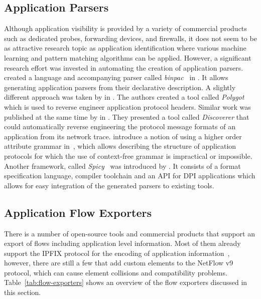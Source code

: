 \subsection{Application Parsers}
Although application visibility is provided by a variety of commercial products such as dedicated probes, forwarding devices, and firewalls, it does not seem to be as attractive research topic as application identification where various machine learning and pattern matching algorithms can be applied. However, a significant research effort was invested in automating the creation of application parsers. \citeauthor{Pang-2006-binpac} created a language and accompanying parser called \emph{binpac}~\cite{Pang-2006-binpac} in \citeyear{Pang-2006-binpac}. It allows generating application parsers from their declarative description. A slightly different approach was taken by \citeauthor{Caballero-2007-Polyglot} in \citeyear{Caballero-2007-Polyglot}. The authors created a tool called \emph{Polygot}~\cite{Caballero-2007-Polyglot} which is used to reverse engineer application protocol headers. Similar work was published at the same time by \citeauthor{Cui-2007-Discoverer} in \cite{Cui-2007-Discoverer}. They presented a tool called \emph{Discoverer} that could automatically reverse engineering the protocol message formats of an application from its network trace. \citeauthor{Davidson-2009-Protocol} introduce a notion of using a higher order attribute grammar in~\cite{Davidson-2009-Protocol}, which allows describing the structure of application protocols for which the use of context-free grammar is impractical or impossible. Another framework, called \emph{Spicy}~\cite{Sommer-2016-Spicy} was introduced by \citeauthor{Sommer-2016-Spicy}. It consists of a format specification language, compiler toolchain and an API for DPI applications which allows for easy integration of the generated parsers to existing tools.

\subsection{Application Flow Exporters}
There is a number of open-source tools and commercial products that support an export of flows including application level information. Most of them already support the IPFIX protocol for the encoding of application information~\cite{Hofstede-2014-Flow}, however, there are still a few that add custom elements to the NetFlow v9 protocol, which can cause element collisions and compatibility problems. Table~\ref{tab:flow-exporters} shows an overview of the flow exporters discussed in this section.

